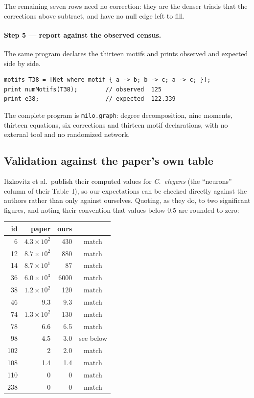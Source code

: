 \documentclass[11pt]{article}
\begin{document}
\noindent
The remaining seven rows need no correction: they are the denser triads that
the corrections above subtract, and have no null edge left to fill.

\paragraph{Step 5 --- report against the observed census.}
The same program declares the thirteen motifs and prints observed and expected
side by side.

\begin{lstlisting}
motifs T38 = [Net where motif { a -> b; b -> c; a -> c; }];
print numMotifs(T38);        // observed  125
print e38;                   // expected  122.339
\end{lstlisting}

\noindent
The complete program is \texttt{milo.graph}: degree decomposition, nine moments,
thirteen equations, six corrections and thirteen motif declarations, with no
external tool and no randomized network.

\subsection{Validation against the paper's own table}

Itzkovitz et al.\ publish their computed values for \textit{C.\ elegans}
(the ``neurons'' column of their Table~I), so our expectations can be checked
directly against the authors rather than only against ourselves. Quoting, as
they do, to two significant figures, and noting their convention that values
below $0.5$ are rounded to zero:

\begin{center}
\begin{tabular}{r r r c}
\toprule
id & paper & ours & \\
\midrule
6 & $4.3\times10^{2}$ & 430 & match \\
12 & $8.7\times10^{2}$ & 880 & match \\
14 & $8.7\times10^{1}$ & 87 & match \\
36 & $6.0\times10^{3}$ & 6000 & match \\
38 & $1.2\times10^{2}$ & 120 & match \\
46 & 9.3 & 9.3 & match \\
74 & $1.3\times10^{2}$ & 130 & match \\
78 & 6.6 & 6.5 & match \\
98 & 4.5 & 3.0 & see below \\
102 & 2 & 2.0 & match \\
108 & 1.4 & 1.4 & match \\
110 & 0 & 0 & match \\
238 & 0 & 0 & match \\
\bottomrule
\end{tabular}
\end{center}
\end{document}
